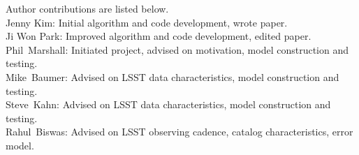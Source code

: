 Author contributions are listed below. \\
Jenny Kim: Initial algorithm and code development, wrote paper. \\
Ji Won Park: Improved algorithm and code development, edited paper. \\
Phil~Marshall: Initiated  project, advised on motivation, model construction and testing. \\
Mike~Baumer: Advised on LSST data characteristics, model construction and testing. \\
Steve~Kahn: Advised on LSST data characteristics, model construction and testing. \\
Rahul~Biswas: Advised on LSST observing cadence, catalog characteristics, error model. \\
